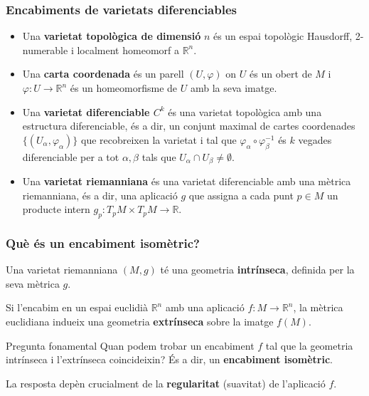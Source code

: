 \documentclass{beamer}
\begin{document}
\begin{frame}
    \frametitle{Encabiments de varietats diferenciables}
    \begin{itemize}
      \item Una \textbf{varietat topològica de dimensió} $n$ és un espai topològic Hausdorff, 2-numerable i localment homeomorf a $\mathbb{R}^n$.
      \item Una \textbf{carta coordenada} és un parell $(U, \varphi)$ on $U$ és un obert de $M$ i $\varphi: U \to \mathbb{R}^n$ és un homeomorfisme de $U$ amb la seva imatge.
      \item Una \textbf{varietat diferenciable $C^k$} és una varietat topològica amb una estructura diferenciable, és a dir, un conjunt maximal de cartes coordenades $\{(U_\alpha, \varphi_\alpha)\}$ que recobreixen la varietat i tal que $\varphi_\alpha \circ \varphi_\beta^{-1}$ és $k$ vegades diferenciable per a tot $\alpha, \beta$ tals que $U_\alpha \cap U_\beta \neq \emptyset$.
      \item Una \textbf{varietat riemanniana} és una varietat diferenciable amb una mètrica riemanniana, és a dir, una aplicació $g$ que assigna a cada punt $p \in M$ un producte intern $g_p: T_pM \times T_pM \to \mathbb{R}$.
    \end{itemize}
  \end{frame}

\begin{frame}
  \frametitle{Què és un encabiment isomètric?}
  
  Una varietat riemanniana $(M, g)$ té una geometria \textbf{intrínseca}, definida per la seva mètrica $g$. 
  
  \vspace{1em}
  
  Si l'encabim en un espai euclidià $\mathbb{R}^n$ amb una aplicació $f: M \to \mathbb{R}^n$, la mètrica euclidiana indueix una geometria \textbf{extrínseca} sobre la imatge $f(M)$. 
  
  \vspace{1em}
  
  \begin{block}{Pregunta fonamental}
    Quan podem trobar un encabiment $f$ tal que la geometria intrínseca i l'extrínseca coincideixin? És a dir, un \textbf{encabiment isomètric}. 
  \end{block}
  
  \vspace{1em}
  
  La resposta depèn crucialment de la \textbf{regularitat} (suavitat) de l'aplicació $f$. 
\end{frame}
\end{document}

